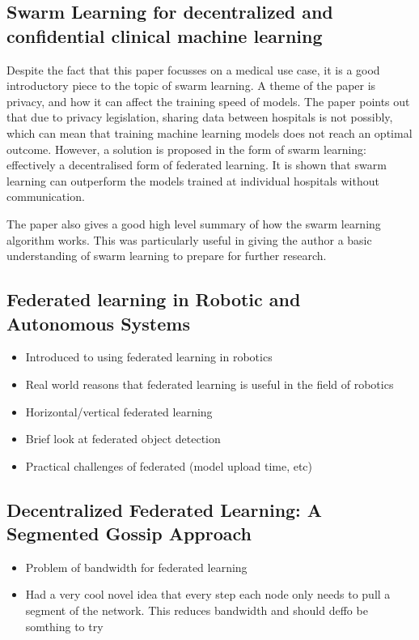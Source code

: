 \documentclass[12pt,a4paper,titlepage]{report}
\begin{document}
	\subsection{Swarm Learning for decentralized and confidential clinical machine learning \cite{swarm_learning}}
	Despite the fact that this paper focusses on a medical use case, it is a good introductory piece to the topic of swarm learning. A theme of the paper is privacy, and how it can affect the training speed of models. The paper points out that due to privacy legislation, sharing data between hospitals is not possibly, which can mean that training machine learning models does not reach an optimal outcome. However, a solution is proposed in the form of swarm learning: effectively a decentralised form of federated learning. It is shown that swarm learning can outperform the models trained at individual hospitals without communication.
	
	The paper also gives a good high level summary of how the swarm learning algorithm works. This was particularly useful in giving the author a basic understanding of swarm learning to prepare for further research.

	\subsection {Federated learning in Robotic and Autonomous Systems \cite{fed_in_robotics}}
	\begin{itemize}
		\item Introduced to using federated learning in robotics
		\item Real world reasons that federated learning is useful in the field of robotics
		\item Horizontal/vertical federated learning
		\item Brief look at federated object detection
		\item Practical challenges of federated (model upload time, etc)
	\end{itemize}

	\subsection{Decentralized Federated Learning: A Segmented Gossip Approach \cite{gossip_learning}}
	\begin{itemize}
		\item Problem of bandwidth for federated learning
		\item Had a very cool novel idea that every step each node only needs to pull a segment of the network. This reduces bandwidth and should deffo be somthing to try
	\end{itemize}
\end{document}
